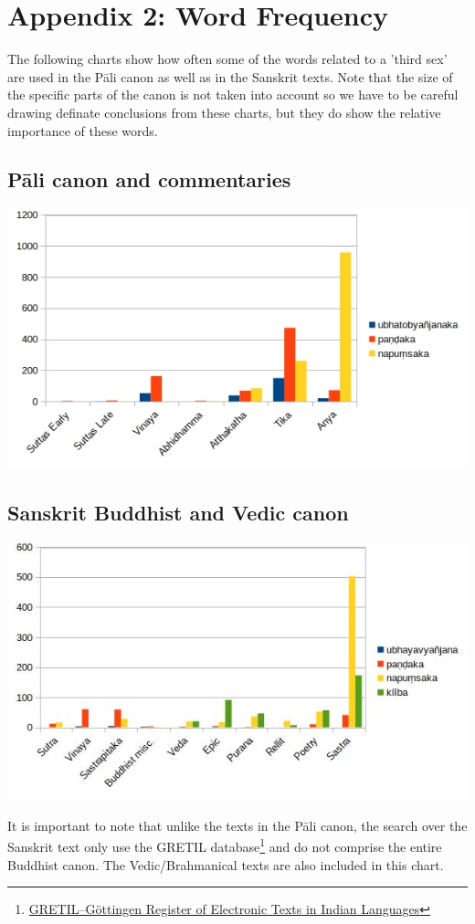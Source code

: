 \section{Appendix 2: Word Frequency}
\label{appendix2}

The following charts show how often some of the words related to a 'third sex' are used in the Pāli canon as well as in the Sanskrit texts. Note that the size of the specific parts of the canon is not taken into account so we have to be careful drawing definate conclusions from these charts, but they do show the relative importance of these words. 

\subsection{Pāli canon and commentaries}

\includegraphics[width=0.7\linewidth]{pali.jpg}
\label{pali1}

\subsection{Sanskrit Buddhist and Vedic canon}

\includegraphics[width=0.7\linewidth]{sanskrit.jpg}
\label{sanskrit1}

\medskip
It is important to note that unlike the texts in the Pāli canon, the search over the Sanskrit text only use the GRETIL database\footnote{\href{http://gretil.sub.uni-goettingen.de/gretil.html}{GRETIL--Göttingen Register of Electronic Texts in Indian Languages}} and do not comprise the entire Buddhist canon. The Vedic/Brahmanical texts are also included in this chart.
